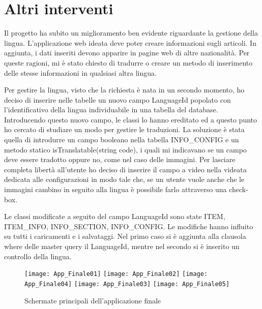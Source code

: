  
\section{Altri interventi}\label{altriInterveti}
Il progetto ha subito un miglioramento ben evidente riguardante la gestione della lingua. L'applicazione web ideata deve poter creare informazioni sugli  articoli. In aggiunta, i dati inseriti devono apparire in pagine web di altre nazionalità. Per queste ragioni, mi è stato chiesto di tradurre o creare un metodo di inserimento delle stesse informazioni in qualsiasi altra lingua.

Per gestire la lingua, visto che la richiesta è nata in un secondo momento, ho deciso di inserire nelle tabelle un nuovo campo LanguageId popolato con l'identificativo della lingua individuabile in una tabella del database.
Introducendo questo nuovo campo, le classi lo hanno ereditato ed a questo punto ho cercato di studiare un modo per gestire le traduzioni. La soluzione è stata quella di introdurre un campo booleano nella tabella INFO\_CONFIG e un metodo statico isTranslatable(string code), i quali mi indicavano se un campo deve essere tradotto oppure no, come nel caso delle immagini.
Per lasciare completa libertà all'utente ho deciso di inserire il campo a video nella videata dedicata alle configurazioni in modo tale che, se un utente vuole anche che le immagini cambino in seguito alla lingua è possibile farlo attraverso una check-box.

Le classi modificate a seguito del campo LanguageId sono state ITEM, ITEM\_INFO, INFO\_SECTION, INFO\_CONFIG. Le modifiche hanno influito su tutti i caricamenti e i salvataggi. Nel primo caso si è aggiunta alla clausola where delle master query il LanguageId, mentre nel secondo si è inserito un controllo della lingua.

\begin{figure}[!h] 
	\centering 
	\texttt{[image: App\_Finale01]}
	\texttt{[image: App\_Finale02]}
	\texttt{[image: App\_Finale04]}
	\texttt{[image: App\_Finale03]} 
	\texttt{[image: App\_Finale05]} 
	\caption{Schermate principali dell'applicazione finale}
	\label{App_finale}
\end{figure}

\newpage
